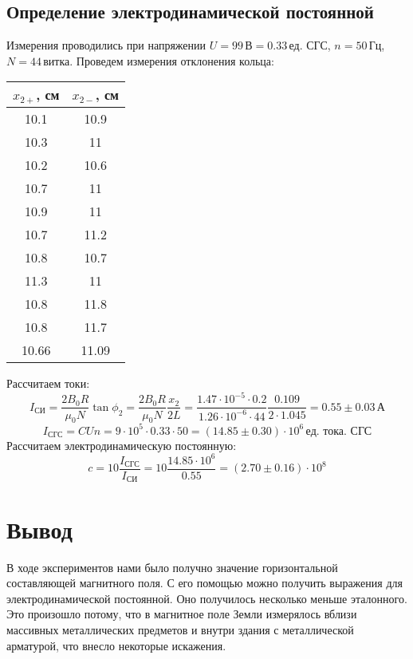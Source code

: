 \documentclass[a4paper,12pt]{article}
\begin{document}
		\subsection{Определение электродинамической постоянной}
		Измерения проводились при напряжении $U = 99\,\text{В}=0.33\,\text{ед. СГС}$, $n = 50\,\text{Гц}$, $N = 44\,\text{витка}$.
		Проведем измерения отклонения кольца:
		\begin{center}
			\begin{tabular}{c|c}
				$x_{2+}$, см & $x_{2-}$, см \\
				\hline 10.1 & 10.9 \\
				\hline 10.3 & 11 \\
				\hline 10.2 & 10.6 \\
				\hline 10.7 & 11 \\
				\hline 10.9 & 11 \\
				\hline 10.7 & 11.2 \\
				\hline 10.8 & 10.7 \\
				\hline 11.3 & 11 \\
				\hline 10.8 & 11.8 \\
				\hline 10.8 & 11.7 \\ \hline\hline
				 10.66 & 11.09
				
			\end{tabular}
		\end{center}
			Рассчитаем токи:
			\begin{equation}
				I_{\text{СИ}} = \frac{2B_0 R}{\mu_0 N}\tan \phi_2 = \frac{2B_0 R}{\mu_0 N}\frac{x_2}{2L} = \frac{1.47\cdot 10^{-5} \cdot 0.2}{1.26\cdot 10^{-6}\cdot 44} \frac{0.109}{2\cdot 1.045} = 0.55 \pm 0.03 \, \text{А}
			\end{equation}
			\begin{equation}
				I_{\text{СГС}} = CUn = 9\cdot 10^5 \cdot 0.33 \cdot 50 = \left(14.85\pm 0.30\right)\cdot 10^6 \, \text{ед. тока. СГС}
			\end{equation}
			Рассчитаем электродинамическую постоянную:
			\begin{equation}
				c = 10\frac{I_{\text{СГС}}}{I_{\text{СИ}}} = 10\frac{14.85\cdot 10^6}{0.55} = \left(2.70\pm 0.16\right)\cdot 10^8
			\end{equation}
	\section{Вывод}
		В ходе экспериментов нами было получно значение горизонтальной составляющей магнитного поля. С его помощью можно получить выражения для электродинамической постоянной. Оно получилось несколько меньше эталонного. Это произошло потому, что в магнитное поле Земли измерялось вблизи массивных металлических предметов и внутри здания с металлической арматурой, что внесло некоторые искажения.
		
\end{document}
